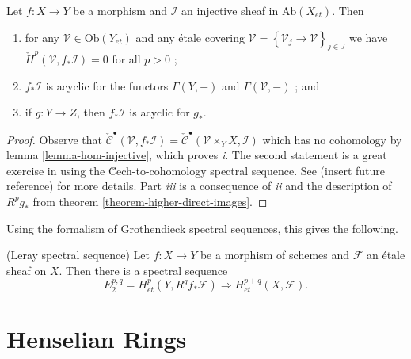 \begin{lemma}
\label{lemma-prepare-leray}
Let $f: X\to Y$ be a morphism and $\mathcal{I}$ an injective sheaf in 
$\text{Ab}(X_{et})$. Then 
\begin{enumerate}
\item 
for any $\mathcal{V}\in\text{Ob}(Y_{et})$ and any \'etale covering 
$\mathcal{V}=\left\{\mathcal{V}_j\to \mathcal{V}\right\}_{j\in J}$  we have 
$\check H^p(\mathcal{V}, f_*\mathcal{I}) = 0$ for all $p>0$ ;
\item 
$f_*\mathcal{I}$ is acyclic for the functors $\Gamma(Y, -)$ and 
$\Gamma(\mathcal{V},-)$ ; and 
\item 
if $g: Y\to Z$, then $f_*\mathcal{I}$ is acyclic for $g_*$.
\end{enumerate}
\end{lemma}

\begin{proof}
Observe that $\check{\mathcal{C}}^\bullet(\mathcal{V}, f_*\mathcal{I}) = 
\check{\mathcal{C}}^\bullet(\mathcal{V}\times_Y X, \mathcal{I})$ which has no 
cohomology by lemma \ref{lemma-hom-injective}, which proves {\it i}. The 
second statement is a great exercise in using the \u Cech-to-cohomology 
spectral sequence. See (insert future reference) for more details. Part {\it 
iii} is a consequence of {\it ii} and the description of $R^pg_*$ from theorem 
\ref{theorem-higher-direct-images}. 
\end{proof}

\noindent
Using the formalism of Grothendieck spectral sequences, this gives the 
following.

\begin{proposition}
\label{proposition-leray}
(Leray spectral sequence)
Let $f: X \to Y$ be a morphism of schemes and $\mathcal{F}$ an \'etale sheaf on 
$X$. Then there is a spectral sequence
$$
E_2^{p,q} = H_{et}^p(Y, R^qf_*\mathcal{F}) \Rightarrow H_{et}^{p+q}(X, 
\mathcal{F}).
$$
\end{proposition}





\section{Henselian Rings}
\label{section-heselian-ring}

